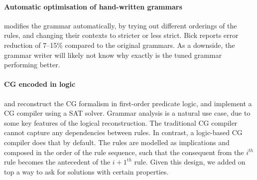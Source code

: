 \paragraph{Automatic optimisation of hand-written grammars }

\cite{bick2013tuning} modifies the grammar automatically, by trying out different orderings of the rules, and changing their contexts to stricter or less strict.
Bick reports error reduction of 7--15\% compared to the original grammars.
As a downside, the grammar writer will likely not know why exactly is the tuned grammar performing better.



\paragraph{CG encoded in logic}

\cite{lager98} and \cite{lager_nivre01} reconstruct the CG formalism in first-order predicate logic, and \cite{listenmaa_claessen2015} implement a CG compiler using a SAT solver.
Grammar analysis is a natural use case, due to some key features of the logical reconstruction.
The traditional CG compiler 
 cannot capture any dependencies between rules.
In contrast, a logic-based CG compiler does that by default. 
The rules are modelled as implications and composed in the order of the rule sequence, such that 
the consequent from the $i^{th}$ rule becomes the antecedent of the $i+1^{th}$ rule.
Given this design, we added on top a way to ask for solutions with certain properties.

